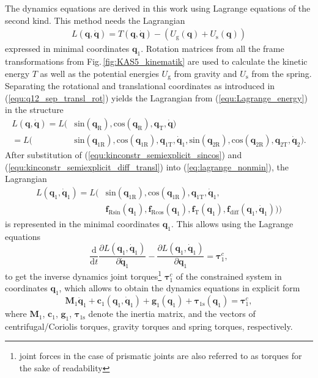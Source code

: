 \documentclass{svproc}
\newcommand{\bm}[1]{\boldsymbol{#1}}
\begin{document}
The dynamics equations are derived in this work using Lagrange equations of the second kind. This method needs the Lagrangian 
%
\begin{align}
L(\bm{q},\dot{\bm{q}}) = T(\bm{q},\dot{\bm{q}})-(U_{\mathrm{g}}(\bm{q})+U_{\mathrm{s}}(\bm{q}))
\label{equ:Lagrange_energy}
\end{align}
%
expressed in minimal coordinates $\bm{q}_{1}$.
Rotation matrices from all the frame transformations from Fig.\,\ref{fig:KAS5_kinematik} are used to calculate the kinetic energy $T$ as well as the potential energies $U_{\mathrm{g}}$ from gravity and $U_{\mathrm{s}}$ from the spring.
Separating the rotational and translational coordinates as introduced in (\ref{equ:q12_sep_transl_rot}) yields the Lagrangian from (\ref{equ:Lagrange_energy}) in the structure
%
\begin{align}
L(\bm{q},\dot{\bm{q}}) =L( & \mathrm{sin}  (\bm{q}_{\mathrm{R}}),\mathrm{cos}(\bm{q}_{\mathrm{R}}), \bm{q}_{\mathrm{T}},\dot{\bm{q}}) \\\label{eq:lagrange_nonmin}
=L( & \mathrm{sin}  (\bm{q}_{1\mathrm{R}}),\mathrm{cos}(\bm{q}_{1\mathrm{R}}), \bm{q}_{1\mathrm{T}},\dot{\bm{q}}_{1}, \mathrm{sin}  (\bm{q}_{2\mathrm{R}}),\mathrm{cos}(\bm{q}_{2\mathrm{R}}), \bm{q}_{2\mathrm{T}},\dot{\bm{q}}_{2}). \nonumber
\end{align}
%
After substitution of (\ref{equ:kinconstr_semiexplicit_sincos}) and (\ref{equ:kinconstr_semiexplicit_diff_transl}) into (\ref{eq:lagrange_nonmin}), the Lagrangian 
%
\begin{align}
L(\bm{q}_1,\dot{\bm{q}}_1)=L( & \mathrm{sin} (\bm{q}_{1\mathrm{R}}),\mathrm{cos}(\bm{q}_{1\mathrm{R}}), \bm{q}_{1\mathrm{T}},\dot{\bm{q}}_{1}, \\ &
\bm{f}_{\mathrm{R}\mathrm{sin}}(\bm{q}_1),
\bm{f}_{\mathrm{R}\mathrm{cos}}(\bm{q}_1),
\bm{f}_{\mathrm{T}}(\bm{q}_1),
\bm{f}_{\mathrm{diff}}(\bm{q}_1,\dot{\bm{q}}_1))) \nonumber
\end{align}
%
is represented in the minimal coordinates $\bm{q}_1$.
This allows using the Lagrange equations
%
\begin{equation}
\frac{\mathrm{d}}{{\mathrm{d}}t}\frac{\partial L(\bm{q}_1,\dot{\bm{q}}_1)}{\partial \dot{\bm{q}}_1} - \frac{\partial L(\bm{q}_1,\dot{\bm{q}}_1)}{\partial \bm{q}_1}= \bm{\tau}^c_1,
\end{equation}
%
to get the inverse dynamics joint torques\footnote{joint forces in the case of prismatic joints are also referred to as torques for the sake of readability} $\bm{\tau}^c_1$ of the constrained system in coordinates $\bm{q}_1$, which allows to obtain the dynamics equations in explicit form
%
\begin{equation}
\bm{M}_1\ddot{\bm{q}}_1+\bm{c}_1(\bm{q}_1,\dot{\bm{q}}_1)+\bm{g}_1(\bm{q}_1) + \bm{\tau}_{1\mathrm{s}}(\bm{q}_1) = \bm{\tau}^c_1,
\label{equ:Dyn_MinKoord}
\end{equation}
%
where $\bm{M}_1$, $\bm{c}_1$, $\bm{g}_1$, $\bm{\tau}_{1\mathrm{s}}$ denote the inertia matrix, and the vectors of centrifugal/Coriolis torques, gravity torques and spring torques, respectively.
\end{document}
